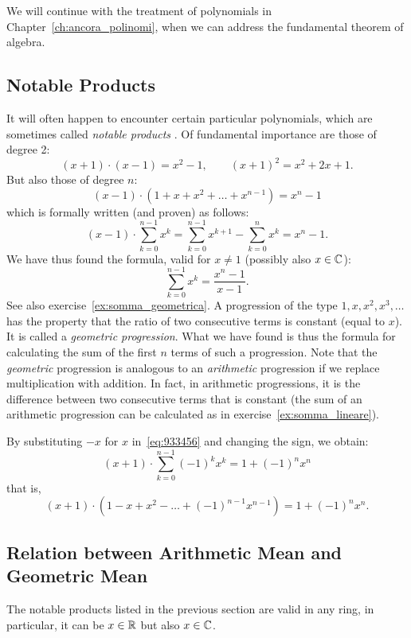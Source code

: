 We will continue with the treatment of polynomials 
in Chapter~\ref{ch:ancora_polinomi}, 
when we can address the fundamental theorem of algebra.

\subsection{Notable Products}
\label{sec:prodotti_notevoli}

It will often happen to encounter certain particular polynomials, which are 
sometimes called \emph{notable products}%
%
. 
Of fundamental importance are those of degree 2:
\[
  (x+1)\cdot(x-1) = x^2-1, \qquad (x+1)^2 = x^2+2x + 1.
\]
But also those of degree $n$:
\[
(x-1)\cdot(1+x+x^2+\dots + x^{n-1}) = x^n - 1
\]
which is formally written (and proven) as follows:
\begin{equation}\label{eq:933456}
  (x-1)\cdot \sum_{k=0}^{n-1} x^k
  = \sum_{k=0}^{n-1} x^{k+1} - \sum_{k=0}^n x^k = x^n - 1.
\end{equation}
We have thus found the formula, valid for $x\neq 1$
(possibly also $x\in {\mathbb C}$):
\[
  \sum_{k=0}^{n-1} x^k = \frac{x^n-1}{x-1}.
\]
See also exercise~\ref{ex:somma_geometrica}.
A progression of the type $1,x,x^2,x^3,\dots$ has the property 
that the ratio of two consecutive terms is constant (equal to $x$).
It is called a \emph{geometric progression}.
%
%
What we have 
found is thus the formula for calculating the sum of the first $n$ terms of 
such a progression.
Note that the \emph{geometric} progression is analogous to an \emph{arithmetic}
progression if we replace multiplication with addition.
In fact, in arithmetic progressions, it is the difference between two
consecutive terms
that is constant 
(the sum of an arithmetic progression can be calculated as 
in exercise~\ref{ex:somma_lineare}).

By substituting $-x$ for $x$ in~\eqref{eq:933456} 
and changing the sign, we obtain:
\[
  (x+1)\cdot \sum_{k=0}^{n-1} (-1)^k x^k
  = 1 + (-1)^n x^n
\]
that is,
\[
(x+1)\cdot (1-x+x^2- \dots + (-1)^{n-1} x^{n-1}) = 1 + (-1)^n x^n.
\]

\subsection{Relation between Arithmetic Mean and Geometric Mean}

The notable products listed in the previous section are valid 
in any ring, in particular, it can be $x\in {\mathbb R}$ but also $x \in {\mathbb C}$.

